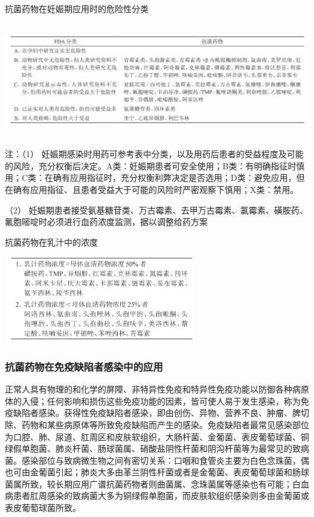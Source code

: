 \begin{table}[htbp]
{\centering
\caption{抗菌药物在妊娠期应用时的危险性分类}
\label{tab154-10}
\includegraphics[width=6.6875in,height=1.95833in]{./images/Image00598.jpg}}

{\small 
注：（1）
妊娠期感染时用药可参考表中分类，以及用药后患者的受益程度及可能的风险，充分权衡后决定。A类：妊娠期患者可安全使用；B类：有明确指征时慎用；C类：在确有应用指征时，充分权衡利弊决定是否选用；D类：避免应用，但在确有应用指征、且患者受益大于可能的风险时严密观察下慎用；X类：禁用。

（2）
妊娠期患者接受氨基糖苷类、万古霉素、去甲万古霉素、氯霉素、磺胺药、氟胞嘧啶时必须进行血药浓度监测，据以调整给药方案
}
\end{table}



\begin{table}[htbp]
\centering
\caption{抗菌药物在乳汁中的浓度}
\label{tab154-11}
\includegraphics[width=3.26042in,height=1.48958in]{./images/Image00599.jpg}
\end{table}

\subsubsection{抗菌药物在免疫缺陷者感染中的应用}

正常人具有物理的和化学的屏障、非特异性免疫和特异性免疫功能以防御各种病原体的入侵；任何影响和损伤这些免疫功能的因素，皆可使人易于发生感染，称为免疫缺陷者感染。获得性免疫缺陷者感染，即由创伤、异物、营养不良、肿瘤、脾切除、药物和某些病原体等所致免疫缺陷而产生的感染。免疫缺陷者最常见感染部位为口腔、肺、尿道、肛周区和皮肤软组织，大肠杆菌、金葡菌、表皮葡萄球菌、铜绿假单胞菌、肺炎杆菌、肠球菌属、硝酸盐阴性杆菌和阴沟杆菌等为最常见的致病菌。感染部位与致病微生物之间有密切关系：口咽和食管炎主要为白色念珠菌，偶也可由金葡菌引起；肺炎大多由革兰阴性杆菌或者是金葡菌、表皮葡萄球菌和肠球菌属所致，较长期应用广谱抗菌药物者则曲菌属、念珠菌属等感染也有可能；白血病患者肛周感染的致病菌大多为铜绿假单胞菌，而皮肤软组织感染则多由金葡菌或表皮葡萄球菌所致。

